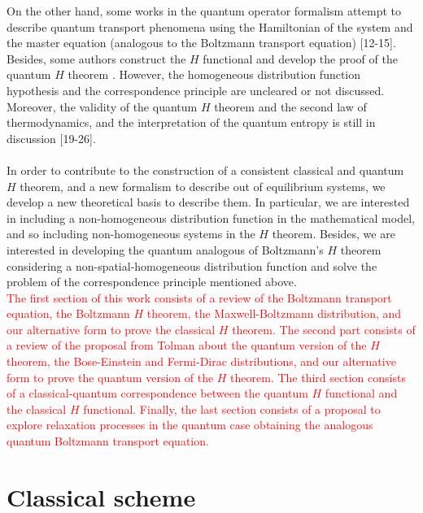 \documentclass{article}
\begin{document}
On the other hand, some works in the quantum operator formalism attempt to describe quantum transport phenomena using the Hamiltonian of the system and the master equation (analogous to the Boltzmann transport equation) [12-15]. 
Besides, some authors construct the $H$ functional and develop the proof of the quantum $H$ theorem \cite{htheorem2, quantum1, quantum2}. However, the homogeneous distribution function hypothesis and the correspondence principle are uncleared or not discussed. Moreover, the validity of the quantum $H$ theorem and the second law of thermodynamics, and the interpretation of the quantum entropy is still in discussion [19-26].\\ 
\\
In order to contribute to the construction of a consistent classical and quantum $H$ theorem, and a new formalism to describe out of equilibrium systems, we develop a new theoretical basis to describe them. In particular, we are interested in including a non-homogeneous distribution function in the mathematical model, and so including non-homogeneous systems in the $H$ theorem. Besides, we are interested in developing the quantum analogous of Boltzmann's $H$ theorem considering a non-spatial-homogeneous distribution function and solve the problem of the correspondence principle mentioned above.\\
\textcolor{red}{The first section of this work consists of a review of the Boltzmann transport equation, the Boltzmann $H$ theorem, the Maxwell-Boltzmann distribution, and our alternative form to prove the classical $H$ theorem. The second part consists of a review of the proposal from Tolman about the quantum version of the $H$ theorem, the Bose-Einstein and Fermi-Dirac distributions, and our alternative form to prove the quantum version of the $H$ theorem. The third section consists of a classical-quantum correspondence between the quantum $H$ functional and the classical $H$ functional. Finally, the last section consists of a proposal to explore relaxation processes in the quantum case obtaining the analogous quantum Boltzmann transport equation.} 





\section{Classical scheme}
\end{document}
